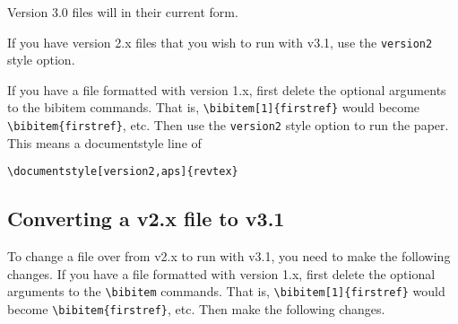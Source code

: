 Version 3.0 files will in their current form. 

If you have version 2.x files that you wish to run with v3.1, use the
\verb+version2+ style option.

If you have a file formatted with version 1.x, first delete the optional
arguments to the bibitem commands. That is, \verb+\bibitem[1]{firstref}+
would become \verb+\bibitem{firstref}+, etc. Then use the \verb+version2+
style option to run the paper. This means a documentstyle line of
\begin{verbatim}
\documentstyle[version2,aps]{revtex}
\end{verbatim}

\subsection{Converting a \REVTeX{} v2.x file to \REVTeX{} v3.1}

To change a file over from v2.x to run with v3.1, you need to make the
following changes. If you have a file formatted with version 1.x, first
delete the optional arguments to the \verb+\bibitem+ commands. That is,
\verb+\bibitem[1]{firstref}+ would become \verb+\bibitem{firstref}+, etc.
Then make the following changes.

